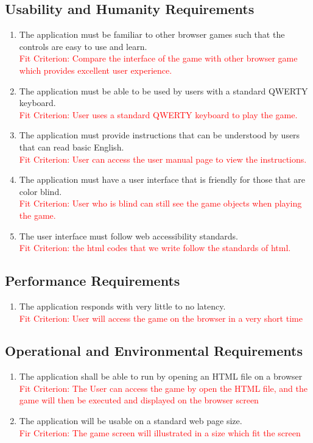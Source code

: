 \documentclass[12pt, titlepage]{article}
\begin{document}
\subsection{Usability and Humanity Requirements}
\begin{enumerate}
    \item The application must be familiar to other browser games such that the controls are easy to use and learn.\\
   \textcolor{red}{Fit Criterion: Compare the interface of the game with other browser game which provides excellent user experience.}
    \item The application must be able to be used by users with a standard QWERTY keyboard.\\
     \textcolor{red}{Fit Criterion: User uses a standard QWERTY keyboard to play the game.}
    \item The application must provide instructions that can be understood by users that can read basic English.\\
      \textcolor{red}{Fit Criterion: User can access the user manual page to view the instructions.}
    \item The application must have a user interface that is friendly for those that are color blind.\\
\textcolor{red}{Fit Criterion: User who is blind can still see the game objects when playing the game.}  
    \item The user interface must follow web accessibility standards.\\
    \textcolor{red}{Fit Criterion: the html codes that we write follow the   standards of html.}  
\end{enumerate}

\subsection{Performance Requirements}
\begin{enumerate}
    \item The application responds with very little to no latency.\\
\textcolor{red}{Fit Criterion: User will access the game on the browser in a very short time}
\end{enumerate}

\subsection{Operational and Environmental Requirements}
\begin{enumerate}
    \item The application shall be able to run by opening an HTML file on a browser\\
\textcolor{red}{Fit Criterion: The User can access the game by open the HTML file, and the game will then be executed and displayed on the browser screen }
    \item The application will be usable on a standard web page size.\\
\textcolor{red}{Fir Criterion: The game screen will illustrated in a size which fit the screen}
\end{enumerate}
\end{document}
